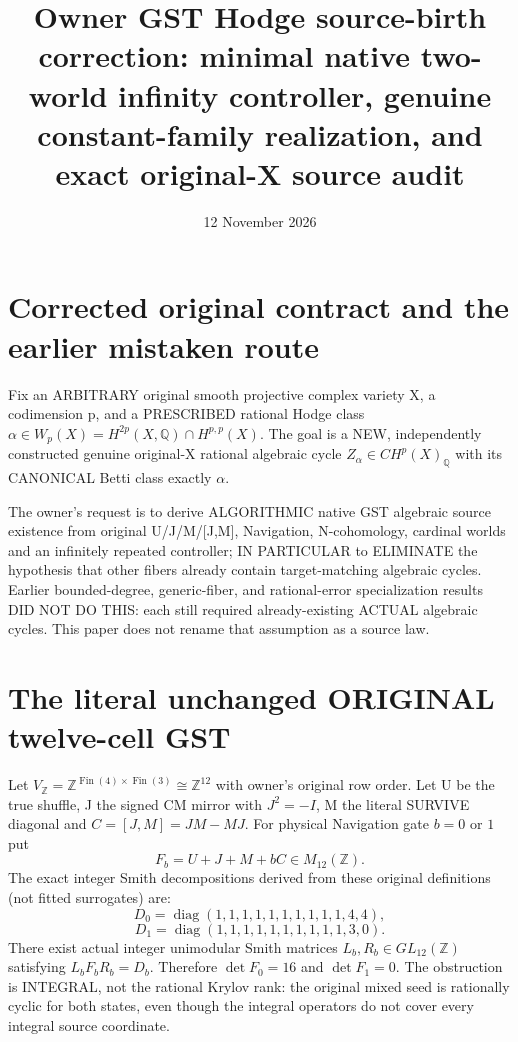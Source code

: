 \documentclass[11pt]{article}
\title{Owner GST Hodge source-birth correction: minimal native two-world infinity controller, genuine constant-family realization, and exact original-X source audit}
\date{12 November 2026}
\begin{document}
\maketitle

\section{Corrected original contract and the earlier mistaken route}
Fix an ARBITRARY original smooth projective complex variety X,
a codimension p, and a PRESCRIBED rational Hodge class
\(\alpha\in W_p(X)=H^{2p}(X,\mathbb Q)\cap H^{p,p}(X)\).
The goal is a NEW, independently constructed genuine original-X
rational algebraic cycle \(Z_\alpha\in CH^p(X)_{\mathbb Q}\)
with its CANONICAL Betti class exactly \(\alpha\).

The owner's request is to derive ALGORITHMIC native GST algebraic
source existence from original U/J/M/[J,M], Navigation, N-cohomology,
cardinal worlds and an infinitely repeated controller; IN PARTICULAR
to ELIMINATE the hypothesis that other fibers already contain
target-matching algebraic cycles. Earlier bounded-degree, generic-fiber,
and rational-error specialization results DID NOT DO THIS:
each still required already-existing ACTUAL algebraic cycles.
This paper does not rename that assumption as a source law.

\section{The literal unchanged ORIGINAL twelve-cell GST}
Let \(V_{\mathbb Z}=\mathbb Z^{\operatorname{Fin}(4)\times\operatorname{Fin}(3)}
\cong\mathbb Z^{12}\) with owner's original row order.
Let U be the true shuffle, J the signed CM mirror with
\(J^2=-I\), M the literal SURVIVE diagonal and
\(C=[J,M]=JM-MJ\).
For physical Navigation gate \(b=0\) or \(1\) put
\[
\boxed{F_b=U+J+M+bC\in M_{12}(\mathbb Z).}
\]
The exact integer Smith decompositions derived from these
original definitions (not fitted surrogates) are:
\[
\boxed{
D_0=\operatorname{diag}(1,1,1,1,1,1,1,1,1,1,4,4),}
\]
\[
\boxed{
D_1=\operatorname{diag}(1,1,1,1,1,1,1,1,1,1,3,0).}
\]
There exist actual integer unimodular Smith matrices
\(L_b,R_b\in GL_{12}(\mathbb Z)\) satisfying
\(L_b F_b R_b=D_b\).
Therefore \(\det F_0=16\) and
\(\det F_1=0\).
The obstruction is INTEGRAL, not the rational
Krylov rank: the original mixed seed is rationally cyclic
for both states, even though the integral operators
do not cover every integral source coordinate.
\end{document}
